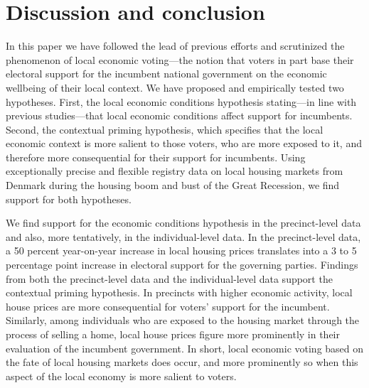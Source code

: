 \documentclass[12pt,a4paper]{article}
\begin{document}
	\section{Discussion and conclusion}
	In this paper we have followed the lead of previous efforts and scrutinized the phenomenon of local economic voting—the notion that voters in part base their electoral support for the incumbent national government on the economic wellbeing of their local context. We have proposed and empirically tested two hypotheses. First, the local economic conditions hypothesis stating—in line with previous studies—that local economic conditions affect support for incumbents. Second, the contextual priming hypothesis, which specifies that the local economic context is more salient to those voters, who are more exposed to it, and therefore more consequential for their support for incumbents. Using exceptionally precise and flexible registry data on local housing markets from Denmark during the housing boom and bust of the Great Recession, we find support for both hypotheses.
	
	We find support for the economic conditions hypothesis in the precinct-level data and also, more tentatively, in the individual-level data. In the precinct-level data, a 50 percent year-on-year increase in local housing prices translates into a 3 to 5 percentage point increase in electoral support for the governing parties. Findings from both the precinct-level data and the individual-level data support the contextual priming hypothesis. In precincts with higher economic activity, local house prices are more consequential for voters’ support for the incumbent. Similarly, among individuals who are exposed to the housing market through the process of selling a home, local house prices figure more prominently in their evaluation of the incumbent government. In short, local economic voting based on the fate of local housing markets does occur, and more prominently so when this aspect of the local economy is more salient to voters.
	
\end{document}
